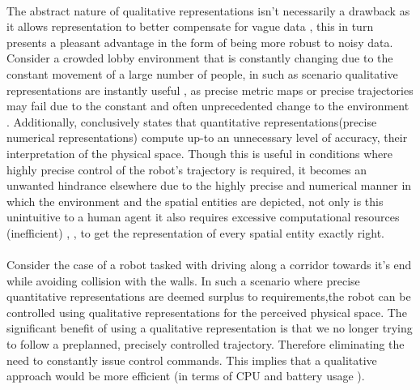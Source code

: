 \paragraph{}The abstract nature of qualitative representations isn't necessarily a drawback as it allows representation to better compensate for vague data \cite{musto1999qualitative}, this in turn presents a pleasant advantage in the form of being more robust to noisy data. Consider a crowded lobby environment that is constantly changing due to the constant movement of a large number of people, in such as scenario qualitative representations are instantly useful \cite{fraser2004application}, as precise metric maps or precise trajectories may fail due to the constant and often unprecedented change to the environment \cite{shah2013qualitative}. Additionally, \cite{musto1999qualitative} conclusively states that quantitative representations(precise numerical representations) compute up-to an unnecessary level of accuracy, their interpretation of the physical space. Though this is useful in conditions where highly precise control of the robot's trajectory is required, it becomes an unwanted hindrance elsewhere due to the highly precise and numerical manner in which the environment and the spatial entities are depicted, not only is this unintuitive to a human agent it also requires excessive computational resources (inefficient) \cite{musto1999qualitative}, \cite{blackwell1988spatial},  \cite{shah2013qualitative}to get the representation of every spatial entity exactly right. 

\paragraph{} Consider the case of a robot tasked with driving along a corridor towards it's end while avoiding collision with the walls. In such a scenario where precise quantitative representations are deemed surplus to requirements,the robot  can be controlled using qualitative representations for the perceived physical space. The significant benefit of using a qualitative representation is that we no longer trying to follow a preplanned, precisely controlled trajectory. Therefore eliminating the need to constantly issue control commands. This implies that a qualitative approach would be more efficient \cite{chen2015survey} (in terms of CPU and battery usage \cite{wakita1995intelligent}).

